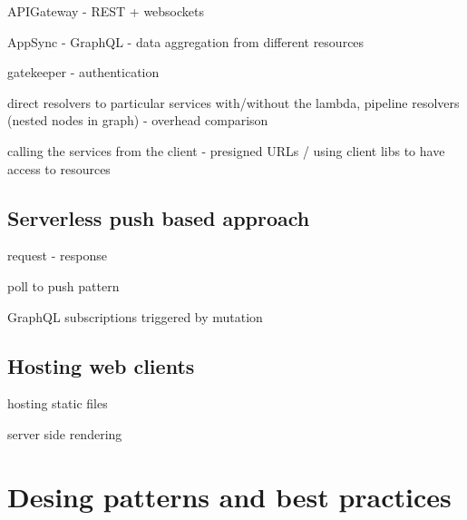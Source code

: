 APIGateway - REST + websockets

AppSync - GraphQL - data aggregation from different resources

gatekeeper - authentication

direct resolvers to particular services with/without the lambda, pipeline resolvers (nested nodes in graph) - overhead comparison

calling the services from the client - presigned URLs / using client libs to have access to resources

\subsection{Serverless push based approach}

request - response

poll to push pattern

GraphQL subscriptions triggered by mutation

\subsection{Hosting web clients}

hosting static files

server side rendering

\section{Desing patterns and best practices}
